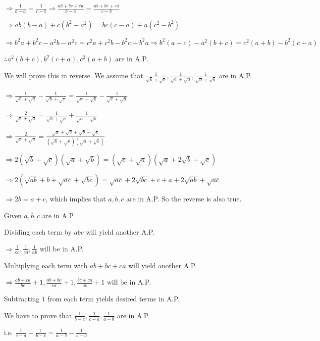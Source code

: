   $\Rightarrow \frac{1}{b - a} = \frac{1}{c - b} \Rightarrow \frac{ab + bc + ca}{b - a} = \frac{ab + bc + ca}{c - b}$

  $\Rightarrow ab(b - a) + c(b^2 - a^2) = bc(c - a) + a(c^2 - b^2)$

  $\Rightarrow b^2a + b^2c - a^2b - a^2c = c^2a + c^2b - b^2c - b^2a \Rightarrow b^2(a + c) - a^2(b + c) = c^2(a + b) - b^2(c + a)$

  $\therefore a^2(b + c), b^2(c + a), c^2(a + b)$ are in A.P.
\item We will prove this in reverse. We assume that $\frac{1}{\sqrt{b} + \sqrt{c}}, \frac{1}{\sqrt{c} + \sqrt{a}},
  \frac{1}{\sqrt{a} + \sqrt{b}}$ are in A.P.

  $\Rightarrow \frac{1}{\sqrt{c} + \sqrt{a}} - \frac{1}{\sqrt{b} + \sqrt{c}} = \frac{1}{\sqrt{a} + \sqrt{b}} -
  \frac{1}{\sqrt{c} + \sqrt{a}}$

  $\Rightarrow \frac{2}{\sqrt{c} + \sqrt{a}} = \frac{1}{\sqrt{b} + \sqrt{c}} + \frac{1}{\sqrt{a} + \sqrt{b}}$

  $\Rightarrow \frac{2}{\sqrt{c} + \sqrt{a}} = \frac{\sqrt{a} + \sqrt{b} + \sqrt{b} + \sqrt{c}}{(\sqrt{b} + \sqrt{c})(\sqrt{a}
    + \sqrt{b})}$

  $\Rightarrow 2(\sqrt{b} + \sqrt{c})(\sqrt{a} + \sqrt{b}) = (\sqrt{c} + \sqrt{a})(\sqrt{a} + 2\sqrt{b} + \sqrt{c})$

  $\Rightarrow 2(\sqrt{ab} + b + \sqrt{ac} + \sqrt{bc}) = \sqrt{ac} + 2\sqrt{bc} + c + a + 2\sqrt{ab} + \sqrt{ac}$

  $\Rightarrow 2b = a + c$, which implies that $a, b, c$ are in A.P. So the reverse is also true.
\item Given $a, b, c$ are in A.P.

  Dividing each term by $abc$ will yield another A.P.

  $\Rightarrow \frac{1}{bc}, \frac{1}{ca}, \frac{1}{ab}$ will be in A.P.

  Multiplying each term with $ab + bc + ca$ will yield another A.P.

  $\Rightarrow \frac{ab + ca}{bc} + 1, \frac{ab + bc}{ca} + 1, \frac{bc + ca}{ab} + 1$ will be in A.P.

  Subtracting $1$ from each term yields desired terms in A.P.
\item We have to prove that $\frac{1}{b - c}, \frac{1}{c - a}, \frac{1}{a - b}$ are in A.P.

  i.e. $\frac{1}{c - a} - \frac{1}{b - c} = \frac{1}{a - b} - \frac{1}{c - a}$


